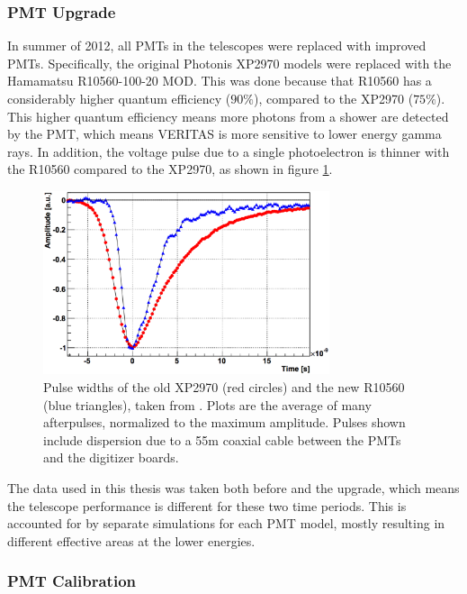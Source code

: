\subsubsection{PMT Upgrade}
In summer of 2012, all PMTs in the telescopes were replaced with improved PMTs.
Specifically, the original Photonis XP2970 models were replaced with the Hamamatsu R10560-100-20 MOD.
This was done because that R10560 has a considerably higher quantum efficiency (\nicetilde$90\%$), compared to the XP2970 (\nicetilde$75\%$).
This higher quantum efficiency means more photons from a shower are detected by the PMT, which means VERITAS is more sensitive to lower energy gamma rays\cite{pmtmodels}.
In addition, the voltage pulse due to a single photoelectron is thinner with the R10560 compared to the XP2970, as shown in figure \ref{fig:pmt_pulse_widths}.

\begin{figure}[h]
  \begin{center}
    \includegraphics[width=0.75\textwidth]{images/pmt_models_pulsewidths.eps}
    \caption[Pulse Widths]{Pulse widths of the old XP2970 (red circles) and the new R10560 (blue triangles), taken from \cite{pmtmodels}.  Plots are the average of many afterpulses, normalized to the maximum amplitude.  Pulses shown include dispersion due to a \nicetilde55m coaxial cable between the PMTs and the digitizer boards.}\label{fig:pmt_pulse_widths}
  \end{center}
\end{figure}

The data used in this thesis was taken both before and the upgrade, which means the telescope performance is different for these two time periods.
This is accounted for by separate simulations for each PMT model, mostly resulting in different effective areas at the lower energies.


\subsubsection{PMT Calibration}

